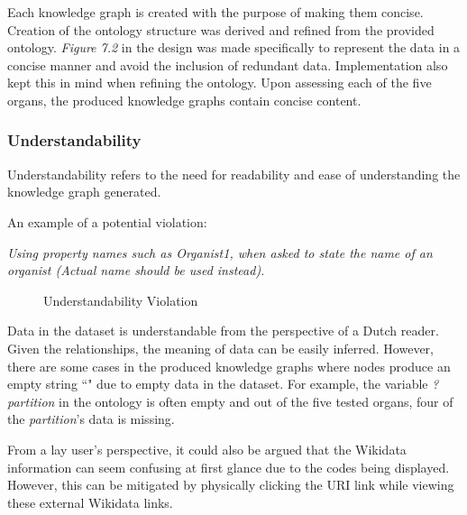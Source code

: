 Each knowledge graph is created with the purpose of making them concise. Creation of the ontology structure was derived and refined from the provided ontology. \textit{Figure 7.2} in the design was made specifically to represent the data in a concise manner and avoid the inclusion of redundant data. Implementation also kept this in mind when refining the ontology. Upon assessing each of the five organs, the produced knowledge graphs contain concise content.

\subsubsection{Understandability}
\hspace{0.5cm} Understandability refers to the need for readability and ease of understanding the knowledge graph generated. \cite{knowledgegraphevaulationbook}

\noindent An example of a potential violation: 
\vspace{-0.1cm}
\begin{displayquote}
    \textit{Using property names such as Organist1, when asked to state the name of an organist (Actual name should be used instead).}
\end{displayquote}

\begin{figure}[H]
\begin{center}
\end{center}
\vspace{-0.5cm}
\caption{Understandability Violation}
\end{figure}

Data in the dataset is understandable from the perspective of a Dutch reader. Given the relationships, the meaning of data can be easily inferred. However, there are some cases in the produced knowledge graphs where nodes produce an empty string ``" due to empty data in the dataset. For example, the variable \textit{?partition} in the ontology is often empty and out of the five tested organs, four of the \textit{partition}'s data is missing. 

From a lay user's perspective, it could also be argued that the Wikidata information can seem confusing at first glance due to the codes being displayed. However, this can be mitigated by physically clicking the URI link while viewing these external Wikidata links.  

